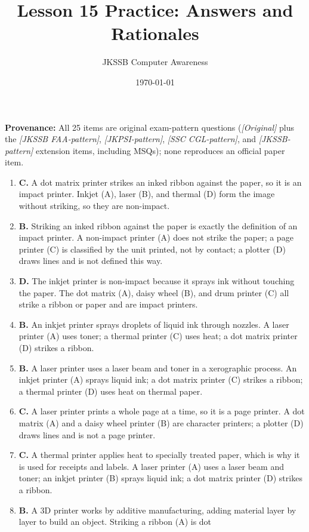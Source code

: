 \documentclass[11pt]{article}
\title{Lesson 15 Practice: Answers and Rationales}
\author{JKSSB Computer Awareness}
\date{\today}
\begin{document}
\maketitle
\noindent\textbf{Provenance:} All 25 items are original exam-pattern questions (\textit{[Original]} plus the \textit{[JKSSB FAA-pattern]}, \textit{[JKPSI-pattern]}, \textit{[SSC CGL-pattern]}, and \textit{[JKSSB-pattern]} extension items, including MSQs); none reproduces an official paper item.
\begin{enumerate}[label=\textbf{Q\arabic*.}, leftmargin=*]
\item \textbf{C.} A dot matrix printer strikes an inked ribbon against the
  paper, so it is an impact printer. Inkjet (A), laser (B), and thermal (D)
  form the image without striking, so they are non-impact.
\item \textbf{B.} Striking an inked ribbon against the paper is exactly the
  definition of an impact printer. A non-impact printer (A) does not strike
  the paper; a page printer (C) is classified by the unit printed, not by
  contact; a plotter (D) draws lines and is not defined this way.
\item \textbf{D.} The inkjet printer is non-impact because it sprays ink
  without touching the paper. The dot matrix (A), daisy wheel (B), and drum
  printer (C) all strike a ribbon or paper and are impact printers.
\item \textbf{B.} An inkjet printer sprays droplets of liquid ink through
  nozzles. A laser printer (A) uses toner; a thermal printer (C) uses heat;
  a dot matrix printer (D) strikes a ribbon.
\item \textbf{B.} A laser printer uses a laser beam and toner in a
  xerographic process. An inkjet printer (A) sprays liquid ink; a dot matrix
  printer (C) strikes a ribbon; a thermal printer (D) uses heat on thermal
  paper.
\item \textbf{C.} A laser printer prints a whole page at a time, so it is a
  page printer. A dot matrix (A) and a daisy wheel printer (B) are character
  printers; a plotter (D) draws lines and is not a page printer.
\item \textbf{C.} A thermal printer applies heat to specially treated paper,
  which is why it is used for receipts and labels. A laser printer (A) uses
  a laser beam and toner; an inkjet printer (B) sprays liquid ink; a dot
  matrix printer (D) strikes a ribbon.
\item \textbf{B.} A 3D printer works by additive manufacturing, adding
  material layer by layer to build an object. Striking a ribbon (A) is dot

\end{enumerate}
\end{document}
